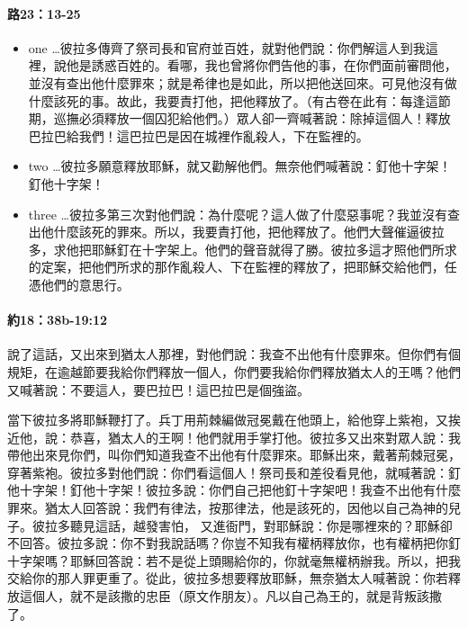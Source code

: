 \paragraph{路23：13-25}
\begin{itemize} 
\item one \dots{彼拉多傳齊了祭司長和官府並百姓，就對他們說：你們解這人到我這裡，說他是誘惑百姓的。看哪，我也曾將你們告他的事，在你們面前審問他，並沒有查出他什麼罪來；就是希律也是如此，所以把他送回來。可見他沒有做什麼該死的事。故此，我要責打他，把他釋放了。（有古卷在此有：每逢這節期，巡撫必須釋放一個囚犯給他們。）眾人卻一齊喊著說：除掉這個人！釋放巴拉巴給我們！這巴拉巴是因在城裡作亂殺人，下在監裡的。}
\item two \dots{彼拉多願意釋放耶穌，就又勸解他們。無奈他們喊著說：釘他十字架！釘他十字架！}
\item three \dots{彼拉多第三次對他們說：為什麼呢？這人做了什麼惡事呢？我並沒有查出他什麼該死的罪來。所以，我要責打他，把他釋放了。他們大聲催逼彼拉多，求他把耶穌釘在十字架上。他們的聲音就得了勝。彼拉多這才照他們所求的定案，把他們所求的那作亂殺人、下在監裡的釋放了，把耶穌交給他們，任憑他們的意思行。}
\end{itemize}

\paragraph{約18：38b-19:12}
說了這話，又出來到猶太人那裡，對他們說：我查不出他有什麼罪來。但你們有個規矩，在逾越節要我給你們釋放一個人，你們要我給你們釋放猶太人的王嗎？他們又喊著說：不要這人，要巴拉巴！這巴拉巴是個強盜。

當下彼拉多將耶穌鞭打了。兵丁用荊棘編做冠冕戴在他頭上，給他穿上紫袍，又挨近他，說：恭喜，猶太人的王啊！他們就用手掌打他。彼拉多又出來對眾人說：我帶他出來見你們，叫你們知道我查不出他有什麼罪來。耶穌出來，戴著荊棘冠冕，穿著紫袍。彼拉多對他們說：你們看這個人！祭司長和差役看見他，就喊著說：釘他十字架！釘他十字架！彼拉多說：你們自己把他釘十字架吧！我查不出他有什麼罪來。猶太人回答說：我們有律法，按那律法，他是該死的，因他以自己為神的兒子。彼拉多聽見這話，越發害怕，
又進衙門，對耶穌說：你是哪裡來的？耶穌卻不回答。彼拉多說：你不對我說話嗎？你豈不知我有權柄釋放你，也有權柄把你釘十字架嗎？耶穌回答說：若不是從上頭賜給你的，你就毫無權柄辦我。所以，把我交給你的那人罪更重了。從此，彼拉多想要釋放耶穌，無奈猶太人喊著說：你若釋放這個人，就不是該撒的忠臣（原文作朋友）。凡以自己為王的，就是背叛該撒了。

